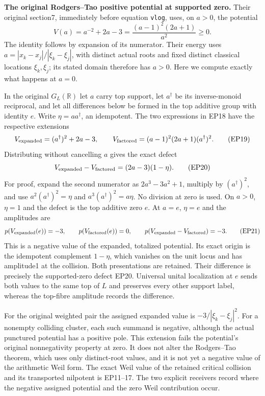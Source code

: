\documentclass[11pt,a4paper]{article}
\theoremstyle{definition}\newtheorem{definition}[theorem]{Definition}
\begin{document}
\EP\textbf{The original Rodgers--Tao positive potential at supported zero.}
Their original section7, immediately before equation \texttt{vlog},
uses, on $a>0$, the potential
\[
 V(a)=a^{-2}+2a-3
      =\frac{(a-1)^2(2a+1)}{a^2}\ge0.
 \tag{EP18}\label{ep:potential}
\]
The identity follows by expansion of its numerator. Their energy
uses $a=|x_k-x_j|/|\xi_k-\xi_j|$, with distinct actual roots and
fixed distinct classical locations $\xi_k,\xi_j$; its stated domain
therefore has $a>0$. Here we compute exactly what happens at $a=0$.

In the original $G_L(\mathbb R)$ let $a$ carry top support, let
$a^\dagger$ be its inverse-monoid reciprocal, and let all differences
below be formed in the top additive group with identity $e$.
Write $\eta=aa^\dagger$, an idempotent. The two expressions
in EP18 have the respective extensions
\[
 V_{\rm expanded}=(a^\dagger)^2+2a-3,\qquad
 V_{\rm factored}=(a-1)^2(2a+1)(a^\dagger)^2.
 \tag{EP19}
\]
Distributing without cancelling $a$ gives the exact defect
\[
 V_{\rm expanded}-V_{\rm factored}
           =(2a-3)(1-\eta).
 \tag{EP20}\label{ep:potentialdefect}
\]
For proof, expand the second numerator as $2a^3-3a^2+1$,
multiply by $(a^\dagger)^2$, and use $a^2(a^\dagger)^2=\eta$
and $a^3(a^\dagger)^2=a\eta$. No division at zero is used.
On $a>0$, $\eta=1$ and the defect is the top additive zero $e$.
At $a=e$, $\eta=e$ and the amplitudes are
\[
 p(V_{\rm expanded}(e))=-3,\qquad
 p(V_{\rm factored}(e))=0,\qquad
 p(V_{\rm expanded}-V_{\rm factored})=-3.
 \tag{EP21}
\]
This is a negative value of the expanded, totalized potential.
Its exact origin is the idempotent complement $1-\eta$, which
vanishes on the unit locus and has amplitude1 at the collision.
Both presentations are retained. Their difference is precisely
the supported-zero defect EP20. Universal unital localization at $e$
sends both values to the same top of $L$ and preserves every other
support label, whereas the top-fibre amplitude records the difference.

For the original weighted pair the assigned expanded value is
$-3/|\xi_k-\xi_j|^2$. For a nonempty colliding cluster, each such
summand is negative, although the actual punctured potential has
a positive pole. This extension fails the potential's original
nonnegativity property at zero. It does not alter the Rodgers--Tao
theorem, which uses only distinct-root values, and it is not yet
a negative value of the arithmetic Weil form. The exact Weil value
of the retained critical collision and its transported nilpotent
is EP11--17. The two explicit receivers record where the negative
assigned potential and the zero Weil contribution occur.
\end{document}
